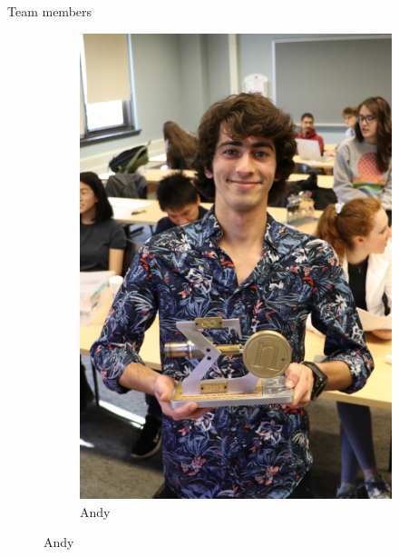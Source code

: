 \begin{frame}{Team members}
\begin{figure}[h!]
\begin{subfigure}[b]{0.21\linewidth}
       \includegraphics[scale=0.36]{figures/Andy.png}
        \caption{Andy}
        \label{fig:Andy}
    \end{subfigure}
\end{figure}

\end{frame}

